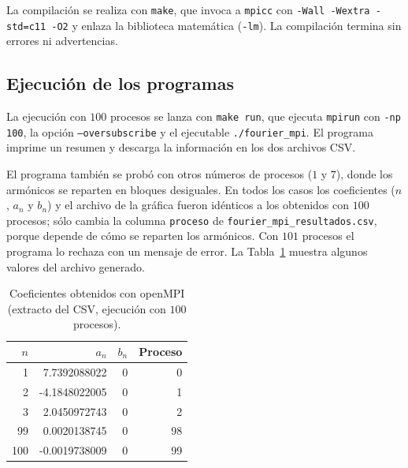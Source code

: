 La compilación se realiza con \texttt{make}, que invoca a \texttt{mpicc} con \texttt{-Wall -Wextra -std=c11 -O2} y enlaza la biblioteca matemática (\texttt{-lm}). La compilación termina sin errores ni advertencias.


\subsection{Ejecución de los programas}

La ejecución con $100$ procesos se lanza con \texttt{make run}, que ejecuta \texttt{mpirun} con \texttt{-np 100}, la opción \texttt{--oversubscribe} y el ejecutable \texttt{./fourier\_mpi}. El programa imprime un resumen y descarga la información en los dos archivos CSV.


El programa también se probó con otros números de procesos ($1$ y $7$), donde los armónicos se reparten en bloques desiguales. En todos los casos los coeficientes ($n$, $a_n$ y $b_n$) y el archivo de la gráfica fueron idénticos a los obtenidos con $100$ procesos; sólo cambia la columna \texttt{proceso} de \texttt{fourier\_\allowbreak mpi\_\allowbreak resultados.csv}, porque depende de cómo se reparten los armónicos. Con $101$ procesos el programa lo rechaza con un mensaje de error. La Tabla~\ref{tab:cap05:valores} muestra algunos valores del archivo generado.

\begin{table}[H]
    \centering
    \caption{Coeficientes obtenidos con openMPI (extracto del CSV, ejecución con $100$ procesos).}
    \label{tab:cap05:valores}
    \begin{tabular}{rrrr}
        \toprule
        \textbf{$n$} & \textbf{$a_n$} & \textbf{$b_n$} & \textbf{Proceso} \\
        \midrule
        1   &  7.7392088022 & 0 & 0  \\
        2   & -4.1848022005 & 0 & 1  \\
        3   &  2.0450972743 & 0 & 2  \\
        99  &  0.0020138745 & 0 & 98 \\
        100 & -0.0019738009 & 0 & 99 \\
        \bottomrule
    \end{tabular}
\end{table}

